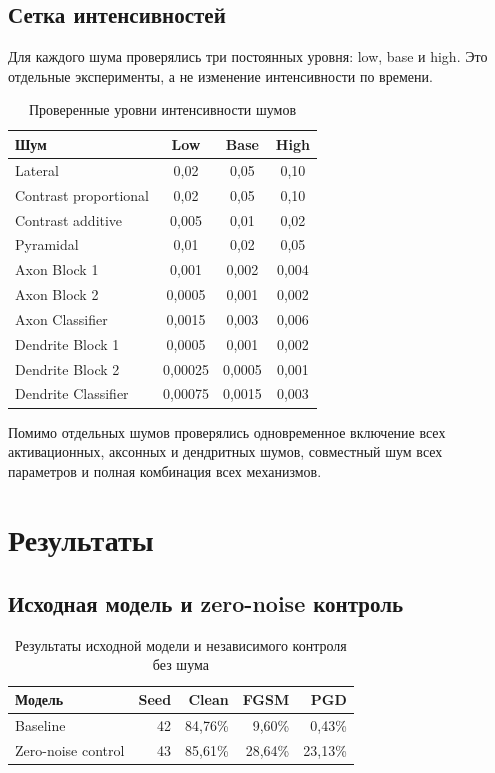\documentclass[a4paper]{article}
\begin{document}
\subsection{Сетка интенсивностей}

Для каждого шума проверялись три постоянных уровня: low, base и high. Это отдельные эксперименты, а не изменение интенсивности по времени.

\begin{table}[H]
\centering
\small
\begin{tabular}{lccc}
\toprule
Шум & Low & Base & High\\
\midrule
Lateral & 0{,}02 & 0{,}05 & 0{,}10\\
Contrast proportional & 0{,}02 & 0{,}05 & 0{,}10\\
Contrast additive & 0{,}005 & 0{,}01 & 0{,}02\\
Pyramidal & 0{,}01 & 0{,}02 & 0{,}05\\
Axon Block 1 & 0{,}001 & 0{,}002 & 0{,}004\\
Axon Block 2 & 0{,}0005 & 0{,}001 & 0{,}002\\
Axon Classifier & 0{,}0015 & 0{,}003 & 0{,}006\\
Dendrite Block 1 & 0{,}0005 & 0{,}001 & 0{,}002\\
Dendrite Block 2 & 0{,}00025 & 0{,}0005 & 0{,}001\\
Dendrite Classifier & 0{,}00075 & 0{,}0015 & 0{,}003\\
\bottomrule
\end{tabular}
\caption{Проверенные уровни интенсивности шумов}
\label{tab:grid}
\end{table}

Помимо отдельных шумов проверялись одновременное включение всех активационных, аксонных и дендритных шумов, совместный шум всех параметров и полная комбинация всех механизмов.

\section{Результаты}

\subsection{Исходная модель и zero-noise контроль}

\begin{table}[H]
\centering
\begin{tabular}{lrrrr}
\toprule
Модель & Seed & Clean & FGSM & PGD\\
\midrule
Baseline & 42 & 84{,}76\% & 9{,}60\% & 0{,}43\%\\
Zero-noise control & 43 & 85{,}61\% & 28{,}64\% & 23{,}13\%\\
\bottomrule
\end{tabular}
\caption{Результаты исходной модели и независимого контроля без шума}
\label{tab:control}
\end{table}
\end{document}
